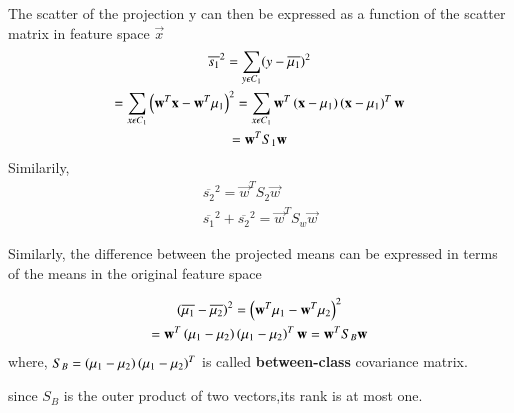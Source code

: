 \documentclass[journal,12pt,twocolumn]{IEEEtran}
\begin{document}
The scatter of the projection y can then be expressed as a function of the scatter matrix in
feature space $\vec{x}$
\begin{multline}
    \overline{s_{1}}^2 = \sum_{y \epsilon C_{1}} (y - \overline{\mu_{1}})^2\\
          =\sum_{x \epsilon C_{1}} \left(\mathbf{w}^{T}\mathbf{x} - \mathbf{w}^{T}\mu_{1}\right)^2 = \sum_{x \epsilon C_{1}} \mathbf{w}^{T}\left(\mathbf{x} - \mu_{1}\right)\left(\mathbf{x} - \mu_{1}\right)^{T}\mathbf{w}\\
          =\mathbf{w}^{T}S_{1}\mathbf{w}
\end{multline}
Similarily,
\begin{align}
    \overline{s_{2}}^2 = \vec{w}^{T}S_{2}\vec{w}\\
    \overline{s_{1}}^2 + \overline{s_{2}}^2 = \vec{w}^{T} S_{w} \vec{w}
\end{align}

Similarly, the difference between the projected means can be expressed in terms of the means
in the original feature space

\begin{multline}
    \left(\overline{\mu_{1}} - \overline{\mu_{2}}\right)^2 = \left(\mathbf{w}^{T}\mu_{1} - \mathbf{w}^{T}\mu_{2}\right)^{2}\\
    =\mathbf{w}^{T}\left(\mu_{1} - \mu_{2}\right)\left(\mu_{1} - \mu_{2}\right)^{T}\mathbf{w} = \mathbf{w}^{T}S_{B}\mathbf{w}
\end{multline}
where, $S_{B} = \left(\mu_{1} - \mu_{2}\right)\left(\mu_{1} - \mu_{2}\right)^{T}$ is called \textbf{between-class} covariance matrix.

since $S_{B}$ is the outer product of two vectors,its rank is at most one.
\end{document}
